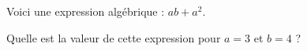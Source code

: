 
Voici une expression algébrique : $ab+a^2$.

Quelle est la valeur de cette expression pour $a=3$ et $b=4$ ?

\smallskip
{}
